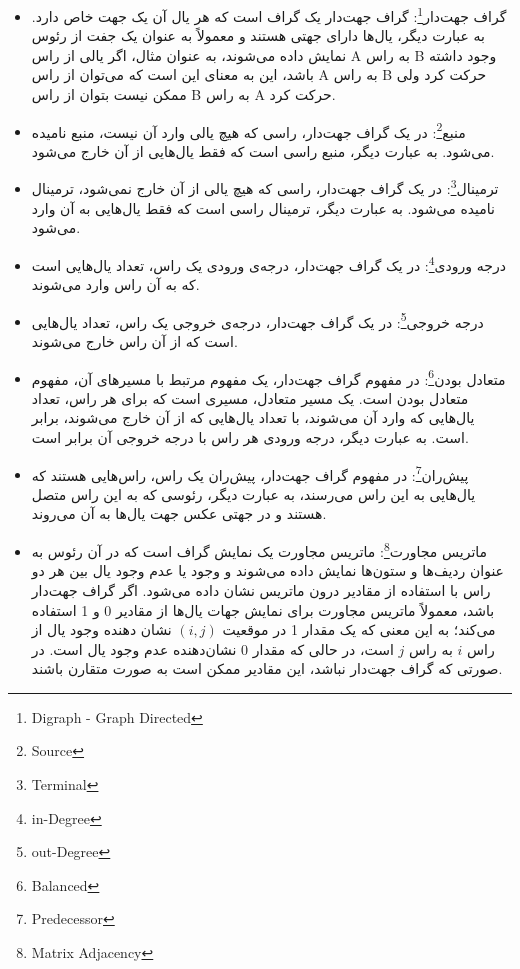 \documentclass[a4paper,10pt]{article}
\begin{document}
\begin{itemize}
        \item گراف جهت‌دار\footnote{\hspace{2pt}Digraph - Graph Directed}: گراف جهت‌دار یک گراف است که هر یال آن یک جهت خاص دارد. به عبارت دیگر، یال‌ها دارای جهتی هستند و معمولاً به عنوان یک جفت از رئوس نمایش داده می‌شوند، به عنوان مثال، اگر یالی از راس A به راس B وجود داشته باشد، این به معنای این است که می‌توان از راس A به راس B حرکت کرد ولی ممکن نیست بتوان از راس B به راس A حرکت کرد.
        
        \item منبع\footnote{\hspace{2pt}Source}: در یک گراف جهت‌دار، راسی که هیچ یالی وارد آن نیست، منبع نامیده می‌شود. به عبارت دیگر، منبع راسی است که فقط یال‌هایی از آن خارج می‌شود.
        
        \item ترمینال\footnote{\hspace{2pt}Terminal}: در یک گراف جهت‌دار، راسی که هیچ یالی از آن خارج نمی‌شود، ترمینال نامیده می‌شود. به عبارت دیگر، ترمینال راسی است که فقط یال‌هایی به آن وارد می‌شود.
        
        \item درجه ورودی\footnote{\hspace{2pt}in-Degree}: در یک گراف جهت‌دار، درجه‌ی ورودی یک راس، تعداد یال‌هایی است که به آن راس وارد می‌شوند.
        
        \item درجه خروجی\footnote{\hspace{2pt}out-Degree}: در یک گراف جهت‌دار، درجه‌ی خروجی یک راس، تعداد یال‌هایی است که از آن راس خارج می‌شوند.

        \item متعادل بودن\footnote{\hspace{2pt}Balanced}: در مفهوم گراف جهت‌دار، یک مفهوم مرتبط با مسیرهای آن، مفهوم متعادل بودن است. یک مسیر متعادل، مسیری است که برای هر راس، تعداد یال‌هایی که وارد آن می‌شوند، با تعداد یال‌هایی که از آن خارج می‌شوند، برابر است. به عبارت دیگر، درجه ورودی هر راس با درجه خروجی آن برابر است.
        
        \item پیش‌ران\footnote{\hspace{2pt}Predecessor}: در مفهوم گراف جهت‌دار، پیش‌ران یک راس، راس‌هایی هستند که یال‌هایی به این راس می‌رسند، به عبارت دیگر، رئوسی که به این راس متصل هستند و در جهتی عکس جهت یال‌ها به آن می‌روند.

        \item ماتریس مجاورت\footnote{\hspace{2pt}Matrix Adjacency}: ماتریس مجاورت یک نمایش گراف است که در آن رئوس به عنوان ردیف‌ها و ستون‌ها نمایش داده می‌شوند و وجود یا عدم وجود یال بین هر دو راس با استفاده از مقادیر درون ماتریس نشان داده می‌شود. اگر گراف جهت‌دار باشد، معمولاً ماتریس مجاورت برای نمایش جهات یال‌ها از مقادیر 0 و 1 استفاده می‌کند؛ به این معنی که یک مقدار 1 در موقعیت $(i, j)$ نشان دهنده وجود یال از راس $i$ به راس $j$ است، در حالی که مقدار 0 نشان‌دهنده عدم وجود یال است. در صورتی که گراف جهت‌دار نباشد، این مقادیر ممکن است به صورت متقارن باشند.
        

\end{itemize}
\end{document}
